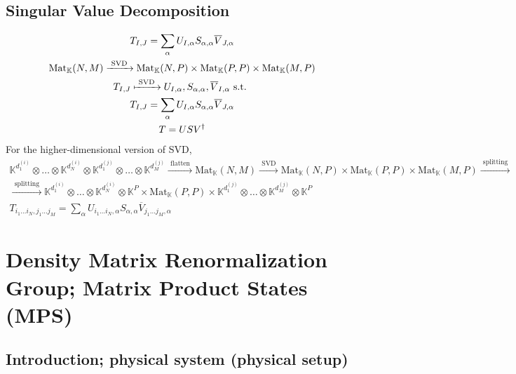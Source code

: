 \documentclass[10pt]{amsart}
\begin{document}
\begin{multicols*}{2}
\subsection{Singular Value Decomposition}  

\begin{equation}
\begin{gathered}
	T_{I,J} = \sum_{\alpha} U_{I,\alpha} S_{\alpha,\alpha} \overline{V}_{J,\alpha} \\ 
 \text{Mat}_{\mathbb{K}}(N,M) \xrightarrow{ \text{ SVD } } \text{Mat}_{\mathbb{K}}(N,P) \times \text{Mat}_{\mathbb{K}}(P,P) \times \text{Mat}_{\mathbb{K}}(M,P)    \\
	T_{I,J} \xmapsto{ \text{ SVD } } U_{I,\alpha}, S_{\alpha,\alpha} , \overline{V}_{I,\alpha} \text{ s.t. } \\
T_{I,J} = \sum_{\alpha} U_{I,\alpha} S_{\alpha, \alpha} \overline{V}_{J,\alpha}    \\
T=USV^{\dag}
\end{gathered}
\end{equation}
For the higher-dimensional version of SVD, 
\begin{equation}
\begin{gathered}
	\mathbb{K}^{d_1^{(i)} } \otimes \dots \otimes \mathbb{K}^{d^{(i)}_N} \otimes \mathbb{K}^{d_1^{(j)} }\otimes \dots \otimes \mathbb{K}^{d_M^{(j)} }  \xrightarrow{ \text{ flatten } } \text{Mat}_{\mathbb{K}}(N,M) \xrightarrow{ \text{ SVD } }     \text{Mat}_{\mathbb{K}}(N,P) \times \text{Mat}_{\mathbb{K}}(P,P) \times \text{Mat}_{\mathbb{K}}(M,P) \xrightarrow{ \text{ splitting } } \\ 
\xrightarrow{ \text{ splitting } } \mathbb{K}^{d_1^{(i)} } \otimes \dots \otimes \mathbb{K}^{d^{(i)}_N} \otimes \mathbb{K}^P \times \text{Mat}_{\mathbb{K}}(P,P) \times  \mathbb{K}^{d_1^{(j)} }\otimes \dots \otimes \mathbb{K}^{d_M^{(j)} } \otimes \mathbb{K}^P  \\
T_{i_1\dots i_N,j_1 \dots j_M} = \sum_{\alpha} U_{i_1\dots i_N,\alpha} S_{\alpha,\alpha} \overline{V}_{j_1 \dots j_M, \alpha}
\end{gathered}
\end{equation}

\section{Density Matrix Renormalization Group; Matrix Product States (MPS)}

\subsection{Introduction; physical system (physical setup)}


\end{multicols*}
\end{document}
